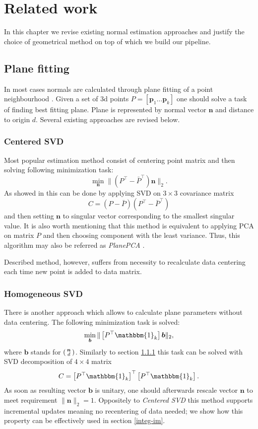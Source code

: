 \chapter{Related work}
In this chapter we revise existing normal estimation approaches and justify the choice of geometrical method on top of which we build our pipeline.

\section{Plane fitting}
In most cases normals are calculated through plane fitting of a point neighbourhood \cite{normal_est}. Given a set of 3d points $P = \left[\bm{p}_1 \dots \bm{p}_k\right]$ one should solve a task of finding best fitting plane. Plane is represented by normal vector $\bm{n}$ and distance to origin $d$. Several existing approaches are revised below.

\subsection{Centered SVD} \label{center-svd}
Most popular estimation method consist of centering point matrix and then solving following minimization task:
\[
\min_{\bm{n}} \| \left(P^\top - \bar{P}^\top \right) \bm{n} \|_2.
\]
As showed in \cite{surface_rec} this can be done by applying SVD on $3 \times 3$ covariance matrix
\[
C = \left(P - \bar{P}\right) \left(P^\top - \bar{P}^\top \right)
\]
and then setting $\bm{n}$ to singular vector corresponding to the smallest singular value. It is also worth mentioning that this method is equivalent to applying PCA on matrix $P$ and then choosing component with the least variance. Thus, this algorithm may also be referred as \textit{PlanePCA} \cite{normal_est}.

Described method, however, suffers from necessity to recalculate data centering each time new point is added to data matrix.

\subsection{Homogeneous SVD} \label{homog-svd}
There is another approach which allows to calculate plane parameters without data centering.
The following minimization task is solved:
\[
\min_{\bm{b}} \| \left[P^\top \mathbbm{1}_k \right] \bm{b} \|_2,
\]
where $\bm{b}$ stands for $\begin{psmallmatrix}
\bm{n} \\
d
\end{psmallmatrix}$. Similarly to section \ref{center-svd} this task can be solved with SVD decomposition of $4 \times 4$ matrix
\[
C = \left[P^\top \mathbbm{1}_k \right]^\top \left[P^\top \mathbbm{1}_k \right].
\]
As soon as resulting vector $\bm{b}$ is unitary, one should afterwards rescale vector $\bm{n}$ to meet requirement $\|\bm{n}\|_2 = 1$. Oppositely to \textit{Centered SVD} this method supports incremental updates meaning no recentering of data needed; we show how this property can be effectively used in section \ref{integ-im}.


